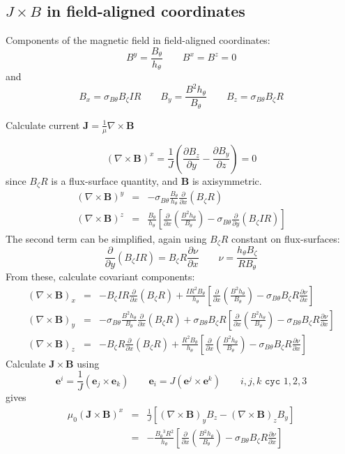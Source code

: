 \documentclass[12pt, a4paper]{article}
\newcommand{\deriv}[2]{\ensuremath{\frac{\partial #1}{\partial #2}}}
\newcommand{\hthe}{\ensuremath{h_\theta}}
\newcommand{\Bp}{\ensuremath{B_\theta}}
\newcommand{\Bt}{\ensuremath{B_\zeta}}
\newcommand{\Vec}[1]{\ensuremath{\mathbf{#1}}}
\newcommand{\Bvec}{\Vec{B}}
\newcommand{\Jvec}{\Vec{J}}
\newcommand{\Curl}[1]{\ensuremath{\nabla\times #1 }}
\newcommand{\sbp}{\ensuremath{\sigma_{B\theta}}}
\begin{document}
\subsection{$J\times B$ in field-aligned coordinates}
\label{sec:jxb_fac}

Components of the magnetic field in field-aligned coordinates:
\[
B^y = \frac{\Bp}{\hthe} \qquad B^x = B^z = 0
\]
and
\[
B_x = \sbp\Bt I R \qquad B_y = \frac{B^2\hthe}{\Bp} \qquad B_z = \sbp\Bt R
\]

Calculate current $\Jvec = \frac{1}{\mu}\Curl{\Bvec}$

\[
\left(\Curl{\Bvec}\right)^x = \frac{1}{J}\left(\deriv{B_z}{y} - \deriv{B_y}{z}\right) = 0
\]
since $\Bt R$ is a flux-surface quantity, and $\Bvec$ is axisymmetric.
\begin{eqnarray*}
\left(\Curl{\Bvec}\right)^y &=& -\sbp\frac{\Bp}{\hthe}\deriv{}{x}\left(\Bt R\right) \\
\left(\Curl{\Bvec}\right)^z &=& \frac{\Bp}{\hthe}\left[\deriv{}{x}\left(\frac{B^2\hthe}{\Bp}\right) - \sbp\deriv{}{y}\left(\Bt I R\right)\right]
\end{eqnarray*}
The second term can be simplified, again using $\Bt R$ constant on flux-surfaces:
\[
\deriv{}{y}\left(\Bt I R\right) = \Bt R\deriv{\nu}{x} \qquad \nu = \frac{\hthe\Bt}{R\Bp}
\]
From these, calculate covariant components:
\begin{eqnarray}
\left(\Curl{\Bvec}\right)_x &=& -\Bt I R \deriv{}{x}\left(\Bt R\right) + \frac{IR^2\Bp}{\hthe}\left[\deriv{}{x}\left(\frac{B^2\hthe}{\Bp}\right) - \sbp\Bt R\deriv{\nu}{x}\right] \nonumber\\
\left(\Curl{\Bvec}\right)_y &=& -\sbp\frac{B^2\hthe}{\Bp}\deriv{}{x}\left(\Bt R\right) + \sbp\Bt R\left[\deriv{}{x}\left(\frac{B^2\hthe}{\Bp}\right) - \sbp\Bt R\deriv{\nu}{x}\right] \label{eq:curlb_y}\\
\left(\Curl{\Bvec}\right)_z &=& -\Bt R\deriv{}{x}\left(\Bt R\right) + \frac{R^2\Bp}{\hthe}\left[\deriv{}{x}\left(\frac{B^2\hthe}{\Bp}\right) - \sbp\Bt R\deriv{\nu}{x}\right] \nonumber
\end{eqnarray}
Calculate $\Jvec\times\Bvec$ using
\begin{equation}
\mathbf{e}^i = \frac{1}{J}\left(\mathbf{e}_j \times \mathbf{e}_k\right) \qquad \mathbf{e}_i = J\left(\mathbf{e}^j \times \mathbf{e}^k\right) \qquad i,j,k \texttt{ cyc } 1,2,3
\label{eq:cross_relation}
\end{equation}
gives 
\begin{eqnarray*}
\mu_0 \left(\Jvec\times\Bvec\right)^x &=& \frac{1}{J}\left[\left(\Curl{\Bvec}\right)_y B_z - \left(\Curl{\Bvec}\right)_z B_y \right]\\
&=& -\frac{\Bp^3 R^2}{\hthe}\left[\deriv{}{x}\left(\frac{B^2\hthe}{\Bp}\right) - \sbp\Bt R\deriv{\nu}{x}\right]
\end{eqnarray*}
\end{document}
